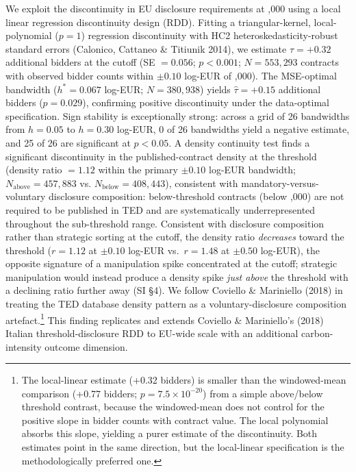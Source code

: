 \documentclass[11pt,a4paper]{article}
\begin{document}
We exploit the discontinuity in EU disclosure requirements at ,000 using a local linear regression discontinuity design (RDD). Fitting a triangular-kernel, local-polynomial ($p=1$) regression discontinuity with HC2 heteroskedasticity-robust standard errors (Calonico, Cattaneo \& Titiunik 2014\cite{calonico2020optimal}), we estimate $\hat{\tau} = +0.32$ additional bidders at the cutoff (SE $= 0.056$; $p < 0.001$; $N = 553{,}293$ contracts with observed bidder counts within $\pm 0.10$ log-EUR of ,000). The MSE-optimal bandwidth ($h^* = 0.067$ log-EUR; $N = 380{,}938$) yields $\hat{\tau} = +0.15$ additional bidders ($p = 0.029$), confirming positive discontinuity under the data-optimal specification. Sign stability is exceptionally strong: across a grid of 26 bandwidths from $h = 0.05$ to $h = 0.30$ log-EUR, 0 of 26 bandwidths yield a negative estimate, and 25 of 26 are significant at $p < 0.05$. A density continuity test finds a significant discontinuity in the published-contract density at the threshold (density ratio $= 1.12$ within the primary $\pm 0.10$ log-EUR bandwidth; $N_{\text{above}} = 457{,}883$ vs. $N_{\text{below}} = 408{,}443$), consistent with mandatory-versus-voluntary disclosure composition: below-threshold contracts (below ,000) are not required to be published in TED and are systematically underrepresented throughout the sub-threshold range. Consistent with disclosure composition rather than strategic sorting at the cutoff, the density ratio \emph{decreases} toward the threshold ($r = 1.12$ at $\pm 0.10$ log-EUR vs.\ $r = 1.48$ at $\pm 0.50$ log-EUR), the opposite signature of a manipulation spike concentrated at the cutoff; strategic manipulation would instead produce a density spike \emph{just above} the threshold with a declining ratio further away (SI \S4). We follow Coviello \& Mariniello (2018)\cite{coviello2018procurement} in treating the TED database density pattern as a voluntary-disclosure composition artefact.\footnote{The local-linear estimate (+0.32 bidders) is smaller than the windowed-mean comparison (+0.77 bidders; $p = 7.5 \times 10^{-20}$) from a simple above/below threshold contrast, because the windowed-mean does not control for the positive slope in bidder counts with contract value. The local polynomial absorbs this slope, yielding a purer estimate of the discontinuity. Both estimates point in the same direction, but the local-linear specification is the methodologically preferred one.} This finding replicates and extends Coviello \& Mariniello's (2018) Italian threshold-disclosure RDD\cite{coviello2018procurement} to EU-wide scale with an additional carbon-intensity outcome dimension.
\end{document}
